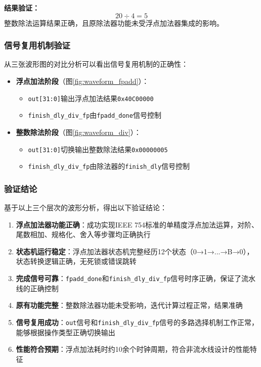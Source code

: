 \documentclass[12pt,a4paper]{article}
\begin{document}
\textbf{结果验证：}
$$20 \div 4 = 5$$
整数除法运算结果正确，且原除法器功能未受浮点加法器集成的影响。

\subsubsection{信号复用机制验证}

从三张波形图的对比分析可以看出信号复用机制的正确性：

\begin{itemize}[itemsep=0pt, parsep=3pt]
    \item \textbf{浮点加法阶段}（图\ref{fig:waveform_fpadd}）：
    \begin{itemize}
        \item \texttt{out[31:0]}输出浮点加法结果\texttt{0x40C00000}
        \item \texttt{finish\_dly\_div\_fp}由\texttt{fpadd\_done}信号控制
    \end{itemize}
    
    \item \textbf{整数除法阶段}（图\ref{fig:waveform_div}）：
    \begin{itemize}
        \item \texttt{out[31:0]}切换输出整数除法结果\texttt{0x00000005}
        \item \texttt{finish\_dly\_div\_fp}由除法器的\texttt{finish\_dly}信号控制
    \end{itemize}
    
\end{itemize}

\subsubsection{验证结论}

基于以上三个层次的波形分析，得出以下验证结论：

\begin{enumerate}[itemsep=0pt, parsep=3pt]
    \item \textbf{浮点加法器功能正确}：成功实现IEEE 754标准的单精度浮点加法运算，对阶、尾数相加、规格化、舍入等步骤均正确执行
    
    \item \textbf{状态机运行稳定}：浮点加法器状态机完整经历12个状态（0→1→...→B→0），状态转换逻辑正确，无死锁或错误跳转
    
    \item \textbf{完成信号可靠}：\texttt{fpadd\_done}和\texttt{finish\_dly\_div\_fp}信号时序正确，保证了流水线的正确控制
    
    \item \textbf{原有功能完整}：整数除法器功能未受影响，迭代计算过程正常，结果准确
    
    \item \textbf{信号复用成功}：\texttt{out}信号和\texttt{finish\_dly\_div\_fp}信号的多路选择机制工作正常，能够根据操作类型正确切换输出
    
    \item \textbf{性能符合预期}：浮点加法耗时约10余个时钟周期，符合非流水线设计的性能特征
\end{enumerate}
\end{document}
